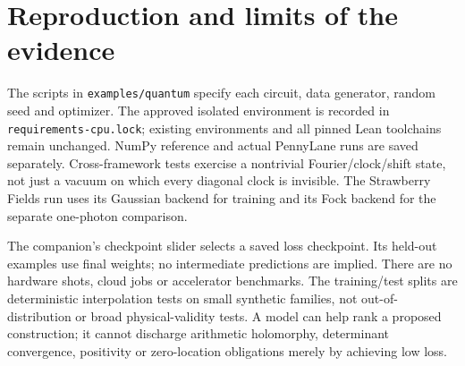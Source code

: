 \section{Reproduction and limits of the evidence}
The scripts in \texttt{examples/quantum} specify each circuit, data generator, random seed and optimizer. The approved isolated environment is recorded in \texttt{requirements-cpu.lock}; existing environments and all pinned Lean toolchains remain unchanged. NumPy reference and actual PennyLane runs are saved separately. Cross-framework tests exercise a nontrivial Fourier/clock/shift state, not just a vacuum on which every diagonal clock is invisible. The Strawberry Fields run uses its Gaussian backend for training and its Fock backend for the separate one-photon comparison.

The companion's checkpoint slider selects a saved loss checkpoint. Its held-out examples use final weights; no intermediate predictions are implied. There are no hardware shots, cloud jobs or accelerator benchmarks. The training/test splits are deterministic interpolation tests on small synthetic families, not out-of-distribution or broad physical-validity tests. A model can help rank a proposed construction; it cannot discharge arithmetic holomorphy, determinant convergence, positivity or zero-location obligations merely by achieving low loss.
